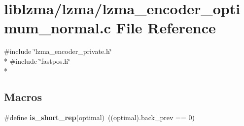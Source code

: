 \section{liblzma/lzma/lzma\-\_\-encoder\-\_\-optimum\-\_\-normal.c File Reference}
\label{lzma__encoder__optimum__normal_8c}
{\ttfamily \#include \char`\"{}lzma\-\_\-encoder\-\_\-private.\-h\char`\"{}}\\*
{\ttfamily \#include \char`\"{}fastpos.\-h\char`\"{}}\\*
\subsection*{Macros}
\begin{DoxyCompactItemize}
\item 
\#define {\bfseries is\-\_\-short\-\_\-rep}(optimal)~((optimal).back\-\_\-prev == 0)\label{lzma__encoder__optimum__normal_8c_aad30c576663dea3caa04cc00438c0491}

\end{DoxyCompactItemize}
